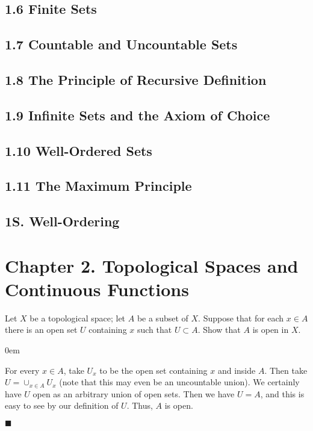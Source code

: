 \documentclass[12pt]{article}
\renewcommand{\qed}{\hfill$\blacksquare$}
\renewenvironment{proof}{\begin{addmargin}[1em]{0em}\begin{newproof}}{\end{newproof}\end{addmargin}\qed}
\newenvironment{problem}[2][Exercise]{\begin{trivlist}
\item[\hskip \labelsep {\bfseries #1}\hskip \labelsep {\bfseries #2.}]}{\end{trivlist}}
\begin{document}
\subsection*{1.6 Finite Sets}



\subsection*{1.7 Countable and Uncountable Sets}



\subsection*{1.8 The Principle of Recursive Definition}



\subsection*{1.9 Infinite Sets and the Axiom of Choice}

\subsection*{1.10 Well-Ordered Sets}


\subsection*{1.11 The Maximum Principle}


\subsection*{1S. Well-Ordering}












\newpage
\section*{Chapter 2. Topological Spaces and Continuous Functions}

\begin{problem}{13.1}
Let $X$ be a topological space; let $A$ be a subset of $X$. Suppose that for each $x\in A$ there is an open set $U$ containing $x$ such that $U \subset A$. Show that $A$ is open in $X$.
\end{problem}
\begin{proof}
	For every $x\in A$, take $U_x$ to be the open set containing $x$ and inside $A$. Then take $U = \cup_{x\in A} U_x$ (note that this may even be an uncountable union). We certainly have $U$ open as an arbitrary union of open sets. Then we have $U=A$, and this is easy to see by our definition of $U$. Thus, $A$ is open.
\end{proof}
\end{document}
